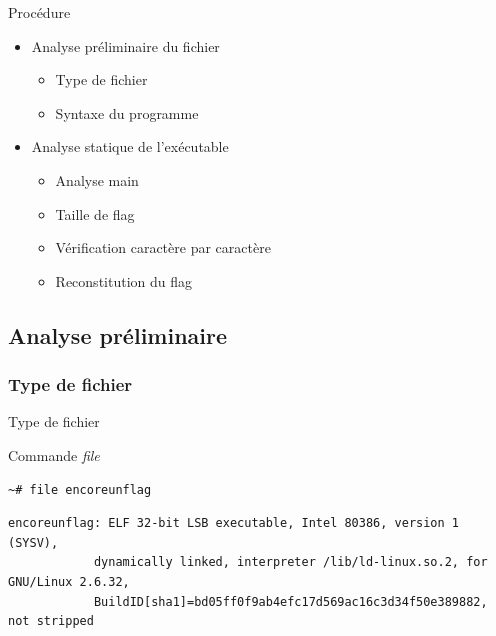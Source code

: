 \documentclass[10pt,sans,usenames,dvipsnames,french,compress]{beamer}
\begin{document}
\begin{frame}{Procédure}
	\begin{itemize}
		\item Analyse préliminaire du fichier
		
		\begin{itemize}
			\item Type de fichier
			\item Syntaxe du programme
		\end{itemize}
		
		\item Analyse statique de l'exécutable
		
		\begin{itemize}
			\item Analyse main
			\item Taille de flag
			\item Vérification caractère par caractère
			\item Reconstitution du flag
		\end{itemize}
	\end{itemize}
\end{frame}

\subsection{Analyse préliminaire}
\subsubsection{Type de fichier}
\begin{frame}[fragile]{Type de fichier}
	\begin{block}{Commande \textit{file}}
		\vspace{-3mm}
		\begin{lstlisting}[style=Term]
			~# file encoreunflag
		\end{lstlisting}
		\vspace{-2mm}
	\end{block}

	\begin{block}{}
		\vspace{-3mm}
		\begin{lstlisting}[style=Term]
			encoreunflag: ELF 32-bit LSB executable, Intel 80386, version 1 (SYSV), 
			dynamically linked, interpreter /lib/ld-linux.so.2, for GNU/Linux 2.6.32,
			BuildID[sha1]=bd05ff0f9ab4efc17d569ac16c3d34f50e389882, not stripped
		\end{lstlisting}
		\vspace{-2mm}
	\end{block}
\end{frame}
\end{document}
